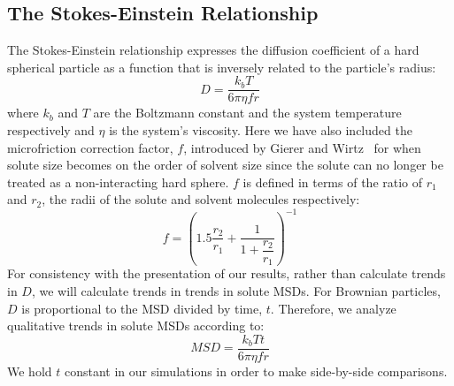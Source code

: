 \documentclass[journal=jpcbfk,manuscript=article]{achemso}
\begin{document}
  \subsection{The Stokes-Einstein Relationship}\label{method:stokes}
  
  The Stokes-Einstein relationship expresses the diffusion coefficient of 
  a hard spherical particle as a function that is inversely related to the
  particle's radius:
  \begin{equation}
  D = \dfrac{k_bT}{6\pi\eta fr}
  \label{eqn:stokes-einstein}
  \end{equation}
  where $k_b$ and $T$ are the Boltzmann	constant and the system temperature
  respectively and $\eta$ is the system's viscosity. Here we have also 
  included the microfriction correction factor, $f$, introduced by 
  Gierer and Wirtz~\cite{gierer_molekulare_1953,chen_diffusion_1984} for when
  solute size becomes on the order of solvent size since the solute can no 
  longer be treated as a non-interacting hard sphere. $f$ is defined in terms
  of the ratio of $r_1$ and $r_2$, the radii of the solute and solvent molecules
  respectively:
  \begin{equation}
  f = \left(1.5\dfrac{r_2}{r_1} + \dfrac{1}{1 + \dfrac{r_2}{r_1}}\right)^{-1}
  \label{eqn:correction_factor}
  \end{equation}
  For consistency with the presentation of our results, rather than calculate 
  trends in $D$, we will calculate trends in trends in solute MSDs. For Brownian
  particles, $D$ is proportional to the MSD divided by time, $t$. Therefore, 
  we analyze qualitative trends in solute MSDs according to:
  \begin{equation}
  MSD = \dfrac{k_bTt}{6\pi\eta fr}
  \label{eqn:msd-stokes-einstein}
  \end{equation}
  We hold $t$ constant in our simulations in order to make side-by-side comparisons. 

  
\end{document}
